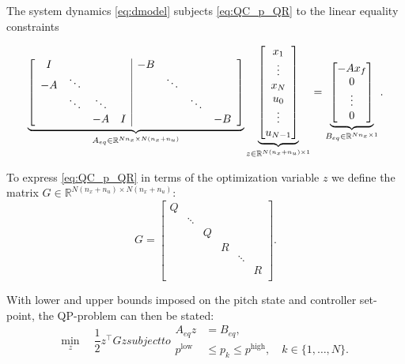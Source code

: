 The system dynamics \eqref{eq:dmodel} subjects \eqref{eq:QC_p_QR} to the linear equality constraints

\begin{equation}
	\label{eq:eq_constraints}
	\underbrace{
	\left[\begin{array}{cccc | ccccc}
	I	&&&&			-B	&&&			\\
	-A	&\ddots&&&			&\ddots&&	\\
		&\ddots&\ddots&&	&&\ddots&	\\
		&& -A & I&			&&& -B		\\
\end{array}\right]}_{A_{eq} \in \mathbb{R}^{Nn_x \times N(n_x+n_u)}}
\underbrace{
\begin{bmatrix} x_1 \\ \vdots \\ x_N \\ u_0 \\ \vdots \\ u_{N-1} \end{bmatrix}}_{z \in \mathbb{R}^{N(n_x+n_u)\times 1}}
=
\underbrace{
\begin{bmatrix}
-A x_f \\ 0 \\ \vdots \\ 0      
\end{bmatrix}}_{B_{eq}\in \mathbb{R}^{Nn_x \times 1}}.
\end{equation}

To express \eqref{eq:QC_p_QR} in terms of the optimization variable $z$ we define the matrix $G \in \mathbb{R}^{N(n_x+n_u) \times N(n_x + n_u)}$:
\begin{equation*}
	G =
	\begin{bmatrix}
	Q	&&&&&		\\
		&\ddots&&&&	\\
		&&Q&&&		\\
		&&&R&&		\\
		&&&&\ddots&	\\
		&&&&&R		\\
	\end{bmatrix}.
\end{equation*}

With lower and upper bounds imposed on the pitch state and controller set-point, the QP-problem can then be stated:
\begin{subequations}
\label{eq:QP_travel}
\begin{equation}
	\min_z \quad \frac{1}{2} z^\top G z
\end{equation}
	subject to
\begin{align}
	A_{eq} z &= B_{eq}, \\
	p^{\textrm{low}} &\le p_k \le p^{\textrm{high}}, \quad k \in \{1, \dots, N\}.
\end{align}
\end{subequations}

